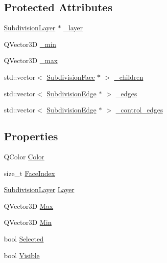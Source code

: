 \subsection*{Protected Attributes}
\begin{DoxyCompactItemize}
\item 
\hyperlink{classShipCADGeometry_1_1SubdivisionLayer}{Subdivision\-Layer} $\ast$ \hyperlink{classShipCADGeometry_1_1SubdivisionControlFace_a83e0b0518f2206f2ceccf1e9e9894f8d}{\-\_\-layer}
\item 
Q\-Vector3\-D \hyperlink{classShipCADGeometry_1_1SubdivisionControlFace_abc8afda2435ea3e2b8f7d66e04eede3d}{\-\_\-min}
\item 
Q\-Vector3\-D \hyperlink{classShipCADGeometry_1_1SubdivisionControlFace_ada4bdde0addfa469e49a36d1ac99bf00}{\-\_\-max}
\item 
std\-::vector$<$ \hyperlink{classShipCADGeometry_1_1SubdivisionFace}{Subdivision\-Face} $\ast$ $>$ \hyperlink{classShipCADGeometry_1_1SubdivisionControlFace_a241bcefc9f6727dec87f6a754f99cc3d}{\-\_\-children}
\item 
std\-::vector$<$ \hyperlink{classShipCADGeometry_1_1SubdivisionEdge}{Subdivision\-Edge} $\ast$ $>$ \hyperlink{classShipCADGeometry_1_1SubdivisionControlFace_a5efceb94118053e2d6ffdff45f68489e}{\-\_\-edges}
\item 
std\-::vector$<$ \hyperlink{classShipCADGeometry_1_1SubdivisionEdge}{Subdivision\-Edge} $\ast$ $>$ \hyperlink{classShipCADGeometry_1_1SubdivisionControlFace_a48e3cc6374d71f4be7106a48fc321eec}{\-\_\-control\-\_\-edges}
\end{DoxyCompactItemize}
\subsection*{Properties}
\begin{DoxyCompactItemize}
\item 
Q\-Color \hyperlink{classShipCADGeometry_1_1SubdivisionControlFace_a07b00d2ff994f882f1032c4a0cf2a288}{Color}
\item 
size\-\_\-t \hyperlink{classShipCADGeometry_1_1SubdivisionControlFace_aecc2c63e4f1cc923ca3df91664c7f2ce}{Face\-Index}
\item 
\hyperlink{classShipCADGeometry_1_1SubdivisionLayer}{Subdivision\-Layer} \hyperlink{classShipCADGeometry_1_1SubdivisionControlFace_a7b41fc40b007567fefacc523bd1454f0}{Layer}
\item 
Q\-Vector3\-D \hyperlink{classShipCADGeometry_1_1SubdivisionControlFace_adb25745071d7a1f7b703c31f8518af41}{Max}
\item 
Q\-Vector3\-D \hyperlink{classShipCADGeometry_1_1SubdivisionControlFace_a34f00f0c4a50ea9124173c67041d9746}{Min}
\item 
bool \hyperlink{classShipCADGeometry_1_1SubdivisionControlFace_a61b316c367087520d43506a86be7caf5}{Selected}
\item 
bool \hyperlink{classShipCADGeometry_1_1SubdivisionControlFace_a49356a1146c3fc1220302deffbc20250}{Visible}
\end{DoxyCompactItemize}


